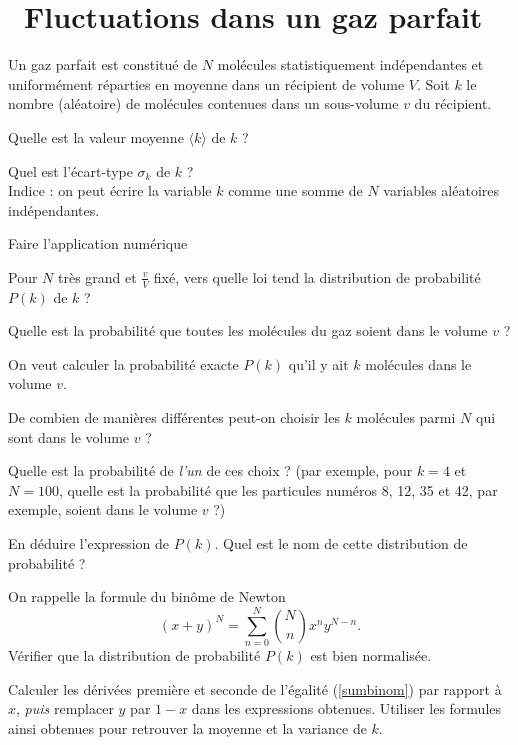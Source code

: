 \documentclass[utf8, 11pt]{feuille}
\begin{document}
\section{\medium~Fluctuations dans un gaz parfait}

Un gaz parfait est constitué de $N$ molécules statistiquement indépendantes et uniformément réparties en moyenne dans un récipient de volume $V$.  Soit $k$ le nombre (aléatoire) de molécules contenues dans un sous-volume $v$ du récipient.

\medskip

\question
Quelle est la valeur moyenne $\langle k \rangle$ de $k$ ?

\question
Quel est l'écart-type $\sigma_k$ de $k$ ? \\
Indice : on peut écrire la variable $k$ comme une somme de $N$ variables aléatoires indépendantes.
  

\question
Faire l'application numérique

\question
Pour $N$ très grand et $\frac{v}{V}$ fixé, vers quelle loi tend la distribution de probabilité $P(k)$ de $k$ ?

\question
Quelle est la probabilité que toutes les molécules du gaz soient dans le volume $v$ ?

On veut calculer la probabilité exacte $P(k)$ qu'il y ait $k$ molécules dans le volume $v$.

\question
De combien de manières différentes peut-on choisir les $k$ molécules parmi $N$ qui sont dans le volume $v$ ?

\question
Quelle est la probabilité de \emph{l'un} de ces choix ? (par exemple, pour $k=4$ et $N=100$, quelle est la probabilité que les particules numéros 8, 12, 35 et 42, par exemple, soient dans le volume $v$ ?)

\question
En déduire l'expression de $P(k)$. Quel est le nom de cette distribution de probabilité ?

\question
On rappelle la formule du binôme de Newton
\begin{equation} 
(x+y)^N=\sum_{n=0}^N \binom Nn x^n y^{N-n}.
\label{sumbinom}
\end{equation}
Vérifier que la distribution de probabilité $P(k)$ est bien normalisée.

\question
Calculer les dérivées première et seconde de l'égalité (\ref{sumbinom}) par rapport à $x$, \emph{puis} remplacer $y$ par $1-x$ dans les expressions obtenues. Utiliser les formules ainsi obtenues pour retrouver la moyenne et la variance de $k$.
\end{document}

